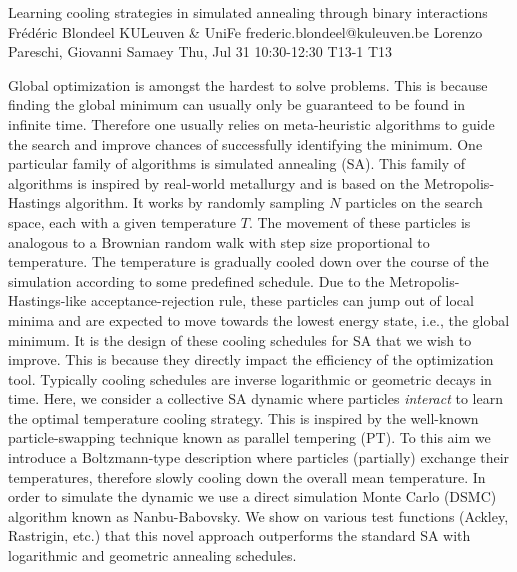 \begin{talk}
  {Learning cooling strategies in simulated annealing through binary interactions}%
  {Frédéric Blondeel}%
  {KULeuven \& UniFe}%
  {frederic.blondeel@kuleuven.be}%
  {Lorenzo Pareschi, Giovanni Samaey}%
  {}%
  {Thu, Jul 31 10:30-12:30}%
  {T13-1}%
  {T13}%
  
				
			
Global optimization is amongst the hardest to solve problems. This is because finding the global minimum can usually only be guaranteed to be found in infinite time. Therefore one usually relies on meta-heuristic algorithms to guide the search and improve chances of successfully identifying the minimum. One particular family of algorithms is simulated annealing (SA). This family of algorithms is inspired by real-world metallurgy and is based on the Metropolis-Hastings algorithm. It works by randomly sampling $N$ particles on the search space, each with a given temperature $T$. The movement of these particles is analogous to a Brownian random walk with step size proportional to temperature. The temperature is gradually cooled down over the course of the simulation according to some predefined schedule. Due to the Metropolis-Hastings-like acceptance-rejection rule, these particles can jump out of local minima and are expected to move towards the lowest energy state, i.e., the global minimum. It is the design of these cooling schedules for SA that we wish to improve. This is because they directly impact the efficiency of the optimization tool. Typically cooling schedules are inverse logarithmic or geometric decays in time. Here, we consider a collective SA dynamic where particles \textit{interact} to learn the optimal temperature cooling strategy. This is inspired by the well-known particle-swapping technique known as parallel tempering (PT). To this aim we introduce a Boltzmann-type description where particles (partially) exchange their temperatures, therefore slowly cooling down the overall mean temperature. In order to simulate the dynamic we use a direct simulation Monte Carlo (DSMC) algorithm known as Nanbu-Babovsky. We show on various test functions (Ackley, Rastrigin, etc.) that this novel approach outperforms the standard SA with logarithmic and geometric annealing schedules.

\end{talk}

